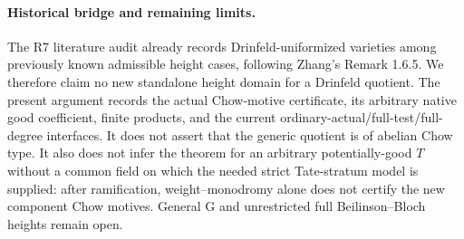 \paragraph{Historical bridge and remaining limits.}
The R7 literature audit already records Drinfeld-uniformized
varieties among previously known admissible height cases,
following Zhang's Remark 1.6.5.  We therefore claim no new
standalone height domain for a Drinfeld quotient.  The present
argument records the actual Chow-motive certificate, its
arbitrary native good coefficient, finite products, and
the current ordinary-actual/full-test/full-degree interfaces.
It does not assert that the generic quotient is of abelian
Chow type.  It also does not infer the theorem for an
arbitrary potentially-good $T$ without a common field on
which the needed strict Tate-stratum model is supplied:
after ramification, weight--monodromy alone does not certify
the new component Chow motives.  General G and unrestricted
full Beilinson--Bloch heights remain open.

